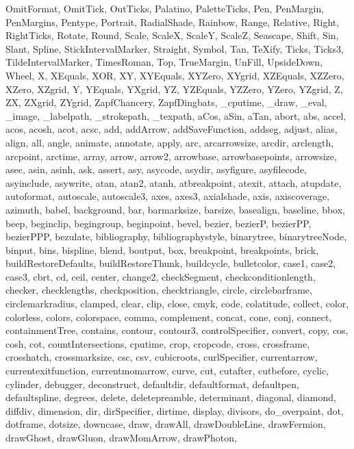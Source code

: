 {{  OmitFormat, OmitTick, OutTicks, Palatino, PaletteTicks, Pen, PenMargin,
  PenMargins, Pentype, Portrait, RadialShade, Rainbow, Range, Relative, Right,
  RightTicks, Rotate, Round, Scale, ScaleX, ScaleY, ScaleZ, Seascape, Shift,
  Sin, Slant, Spline, StickIntervalMarker, Straight, Symbol, Tan, TeXify,
  Ticks, Ticks3, TildeIntervalMarker, TimesRoman, Top, TrueMargin, UnFill,
  UpsideDown, Wheel, X, XEquals, XOR, XY, XYEquals, XYZero, XYgrid, XZEquals,
  XZZero, XZero, XZgrid, Y, YEquals, YXgrid, YZ, YZEquals, YZZero, YZero,
  YZgrid, Z, ZX, ZXgrid, ZYgrid, ZapfChancery, ZapfDingbats, _cputime, _draw,
  _eval, _image, _labelpath, _strokepath, _texpath, aCos, aSin, aTan, abort,
  abs, accel, acos, acosh, acot, acsc, add, addArrow, addSaveFunction, addseg,
  adjust, alias, align, all, angle, animate, annotate, apply, arc,
  arcarrowsize, arcdir, arclength, arcpoint, arctime, array, arrow, arrow2,
  arrowbase, arrowbasepoints, arrowsize, asec, asin, asinh, ask, assert, asy,
  asycode, asydir, asyfigure, asyfilecode, asyinclude, asywrite, atan, atan2,
  atanh, atbreakpoint, atexit, attach, atupdate, autoformat, autoscale,
  autoscale3, axes, axes3, axialshade, axis, axiscoverage, azimuth, babel,
  background, bar, barmarksize, barsize, basealign, baseline, bbox, beep,
  beginclip, begingroup, beginpoint, bevel, bezier, bezierP, bezierPP,
  bezierPPP, bezulate, bibliography, bibliographystyle, binarytree,
  binarytreeNode, binput, bins, bispline, blend, boutput, box, breakpoint,
  breakpoints, brick, buildRestoreDefaults, buildRestoreThunk, buildcycle,
  bulletcolor, case1, case2, case3, cbrt, cd, ceil, center, change2,
  checkSegment, checkconditionlength, checker, checklengths, checkposition,
  checktriangle, circle, circlebarframe, circlemarkradius, clamped, clear,
  clip, close, cmyk, code, colatitude, collect, color, colorless, colors,
  colorspace, comma, complement, concat, cone, conj, connect, containmentTree,
  contains, contour, contour3, controlSpecifier, convert, copy, cos, cosh, cot,
  countIntersections, cputime, crop, cropcode, cross, crossframe, crosshatch,
  crossmarksize, csc, csv, cubicroots, curlSpecifier, currentarrow,
  currentexitfunction, currentmomarrow, curve, cut, cutafter, cutbefore,
  cyclic, cylinder, debugger, deconstruct, defaultdir, defaultformat,
  defaultpen, defaultspline, degrees, delete, deletepreamble, determinant,
  diagonal, diamond, diffdiv, dimension, dir, dirSpecifier, dirtime, display,
  divisors, do_overpaint, dot, dotframe, dotsize, downcase, draw, drawAll,
  drawDoubleLine, drawFermion, drawGhost, drawGluon, drawMomArrow, drawPhoton,
}}
